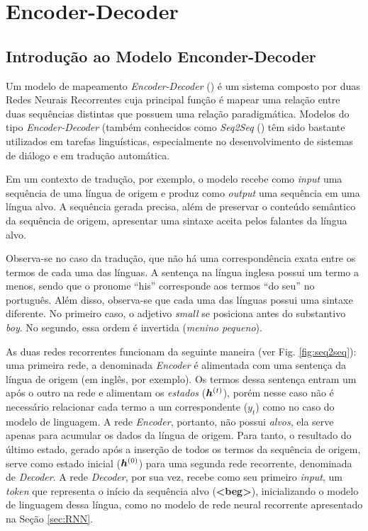\chapter{Encoder-Decoder}
\label{ch:05}


\section{Introdução ao Modelo Enconder-Decoder}
\label{sec:intro-sec-sec}
Um modelo de mapeamento \textit{Encoder-Decoder} (\cite{enc-dec:2014}) é um sistema composto por duas Redes Neurais Recorrentes cuja principal função é mapear uma relação entre duas sequências distintas que possuem uma relação paradigmática. Modelos do tipo \textit{Encoder-Decoder} (também conhecidos como \textit{Seq2Seq} (\cite{seq2seq:2014}) têm sido bastante utilizados em tarefas linguísticas, especialmente no desenvolvimento de sistemas de diálogo e em tradução automática.

Em um contexto de tradução, por exemplo, o modelo recebe como \textit{input }uma sequência de uma língua de origem e produz como \textit{output} uma sequência em uma língua alvo. A sequência gerada precisa, além de preservar o conteúdo semântico da sequência de origem, apresentar uma sintaxe aceita pelos falantes da língua alvo. 


Observa-se no caso da tradução, que não há uma correspondência exata entre os termos de cada uma das línguas. A sentença na língua inglesa possui um termo a menos, sendo que o pronome “his” corresponde aos termos “do seu” no português. Além disso, observa-se que cada uma das línguas possui uma sintaxe diferente. No primeiro caso, o adjetivo \textit{small} se posiciona antes do substantivo \textit{boy}. No segundo, essa ordem é invertida (\textit{menino pequeno}). 

As duas redes recorrentes funcionam da seguinte maneira (ver Fig. \ref{fig:seq2seq}): uma primeira rede, a denominada \textit{Encoder} é alimentada com uma sentença da língua de origem (em inglês, por exemplo). Os termos dessa sentença entram um após o outro na rede e alimentam os \textit{estados} ($\bm{h}^{(t)}$), porém nesse caso não é necessário relacionar cada termo a um correspondente ($y_t$) como no caso do modelo de linguagem. A rede \textit{Encoder}, portanto, não possui \textit{alvos}, ela serve apenas para acumular os dados da língua de origem. Para tanto, o resultado do último estado, gerado após a inserção de todos os termos da sequência de origem, serve como estado inicial ($\bm{h}^{(0)}$) para uma segunda rede recorrente, denominada de \textit{Decoder}. A rede \textit{Decoder}, por sua vez, recebe como seu primeiro \textit{input}, um \textit{token} que representa o início da sequência alvo (\textbf{<beg>}), inicializando o modelo de linguagem dessa língua, como no modelo de rede neural recorrente apresentado na Seção \ref{sec:RNN}. 

